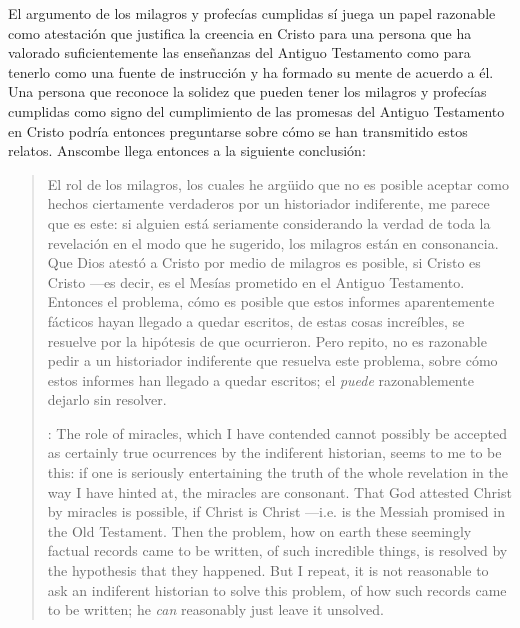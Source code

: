 El argumento de los milagros y profecías cumplidas sí juega un papel razonable
como atestación que justifica la creencia en Cristo para una persona que ha
valorado suficientemente las enseñanzas del Antiguo Testamento como para tenerlo
como una fuente de instrucción y ha formado su mente de acuerdo a él. Una
persona que reconoce la solidez que pueden tener los milagros y profecías
cumplidas como signo del cumplimiento de las promesas del Antiguo Testamento en
Cristo podría entonces preguntarse sobre cómo se han transmitido estos relatos.
Anscombe llega entonces a la siguiente conclusión:
\blockquote[{\cite[37]{anscombe2008faith:prophandmi}}: The role of miracles,
which I have contended cannot possibly be accepted as certainly true ocurrences
by the indiferent historian, seems to me to be this: if one is seriously
entertaining the truth of the whole revelation in the way I have hinted at, the
miracles are consonant. That God attested Christ by miracles is possible, if
Christ is Christ ---i.e. is the Messiah promised in the Old Testament. Then the
problem, how on earth these seemingly factual records came to be written, of
such incredible things, is resolved by the hypothesis that they happened.
\textelp{} But I repeat, it is not reasonable to ask an indiferent historian to
solve this problem, of how such records came to be written; he \emph{can}
reasonably just leave it unsolved.]{El rol de los milagros, los cuales he
  argüido que no es posible aceptar como hechos ciertamente verdaderos por un
  historiador indiferente, me parece que es este: si alguien está seriamente
  considerando la verdad de toda la revelación en el modo que he sugerido, los
  milagros están en consonancia. Que Dios atestó a Cristo por medio de milagros
  es posible, si Cristo es Cristo ---es decir, es el Mesías prometido en el
  Antiguo Testamento. Entonces el problema, cómo es posible que estos informes
  aparentemente fácticos hayan llegado a quedar escritos, de estas cosas
  increíbles, se resuelve por la hipótesis de que ocurrieron. \textelp{} Pero
  repito, no es razonable pedir a un historiador indiferente que resuelva este
  problema, sobre cómo estos informes han llegado a quedar escritos; el
  \emph{puede} razonablemente dejarlo sin resolver.}

